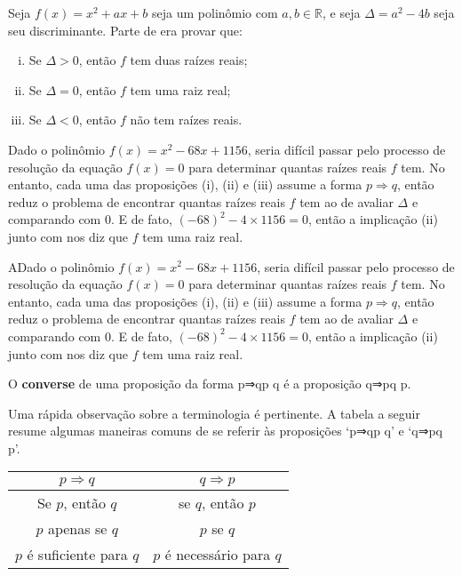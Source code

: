 \begin{itemizar}
\begin{example}
Seja $f(x) = x^2+ax+b$ seja um polinômio com $a,b \in \mathbb{R}$, e seja $\Delta = a^2-4b$ seja seu discriminante. Parte de  era provar que:
\begin{enumerate}[(i)]
\item Se $\Delta > 0$, então $f$ tem duas raízes reais;
\item Se $\Delta = 0$, então $f$ tem uma raiz real;
\item Se $\Delta < 0$, então $f$ não tem raízes reais.
\end{enumerate}
Dado o polinômio $f(x) = x^2-68x+1156$, seria difícil passar pelo processo de resolução da equação $f(x)=0$ para determinar quantas raízes reais $f $ tem. No entanto, cada uma das proposições (i), (ii) e (iii) assume a forma $p \Rightarrow q$, então  reduz o problema de encontrar quantas raízes reais $f$ tem ao de avaliar $\Delta$ e comparando com $0$. E de fato, $(-68)^2 - 4 \times 1156 = 0$, então a implicação (ii) junto com \elimrule{\Rightarrow} nos diz que $f$ tem uma raiz real.
\end{example}

ADado o polinômio $f(x) = x^2-68x+1156$, seria difícil passar pelo processo de resolução da equação $f(x)=0$ para determinar quantas raízes reais $f $ tem. No entanto, cada uma das proposições (i), (ii) e (iii) assume a forma $p \Rightarrow q$, então  reduz o problema de encontrar quantas raízes reais $f$ tem ao de avaliar $\Delta$ e comparando com $0$. E de fato, $(-68)^2 - 4 \times 1156 = 0$, então a implicação (ii) junto com \elimrule{\Rightarrow} nos diz que $f$ tem uma raiz real.

\begin{definition}
\label{defConverse}
O \textbf{converse} de uma proposição da forma p⇒qp \Rightarrow q é a proposição q⇒pq \Rightarrow p.
\end{definition}

Uma rápida observação sobre a terminologia é pertinente. A tabela a seguir resume algumas maneiras comuns de se referir às proposições `p⇒qp \Rightarrow q' e `q⇒pq \Rightarrow p'.

\begin{center}
\begin{tabular}{c|c}
$p \Rightarrow q$ & $q \Rightarrow p$ \\ \hline
Se $p$, então $q$ & se $q$, então $p$ \\
$p$ apenas se $q$ & $p$ se $q$ \\
$p$ é suficiente para $q$ & $p$ é necessário para $q$
\end{tabular}
\end{center}


\end{itemizar}
